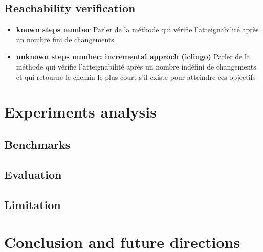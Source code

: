 \documentclass{CAV}
\theoremstyle{remark}
\newcounter{la}
\begin{document}
\subsection{Reachability verification}
\begin{itemize}


\item \textbf{known steps number } 
Parler de la méthode qui vérifie l'atteignabilité après un nombre fini de changements
\item \textbf{unknown steps number: incremental approch (iclingo)}
Parler de la méthode qui vérifie l'atteignabilité après un nombre indéfini de changements et qui retourne le chemin le plus court s'il existe pour atteindre ces objectifs
\end{itemize}

\section{Experiments  analysis}
\subsection{Benchmarks }
\subsection{Evaluation}
\subsection{Limitation}

\section{Conclusion and future directions}

  
\end{document}
